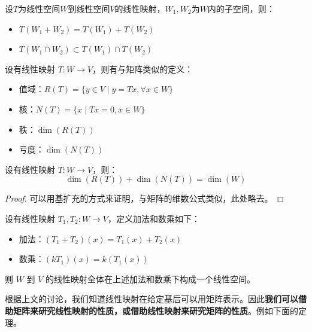 \begin{theorem}
设$T$为线性空间$W$到线性空间$V$的线性映射，$W_1,W_2$为$W$内的子空间，则：
\begin{itemize}
    \item $T(W_1+W_2)=T(W_1)+T(W_2)$
    \item $T(W_1\cap W_2)\subset T(W_1)\cap T(W_2)$
\end{itemize}
\end{theorem}

\begin{definition}[线性映射的值域和核]
设有线性映射 $T:W\to V$，则有与矩阵类似的定义：
\begin{itemize}
    \item 值域：$R(T)=\{y\in V\mid y=Tx,\forall x\in W\}$
    \item 核：$N(T)=\{x\mid Tx=0,x\in W\}$
    \item 秩：$\dim(R(T))$
    \item 亏度：$\dim(N(T))$
\end{itemize}
\end{definition}

\begin{theorem}[线性映射的维数公式]
设有线性映射 $T:W\to V$，则：
\[\dim(R(T))+\dim(N(T))=\dim(W)\]
\end{theorem}
\begin{proof}
可以用基扩充的方式来证明，与矩阵的维数公式类似，此处略去。
\end{proof}

\begin{theorem}[线性映射构成的空间]
设有线性映射 $T_1,T_2: W\to V$，定义加法和数乘如下：
\begin{itemize}
    \item 加法：$(T_1+T_2)(x)=T_1(x)+T_2(x)$
    \item 数乘：$(kT_1)(x)=k(T_1(x))$
\end{itemize}
则 $W$ 到 $V$ 的线性映射全体在上述加法和数乘下构成一个线性空间。
\end{theorem}

\begin{remark}
根据上文的讨论，我们知道线性映射在给定基后可以用矩阵表示。因此\textbf{我们可以借助矩阵来研究线性映射的性质，或借助线性映射来研究矩阵的性质}。例如下面的定理。
\end{remark}

